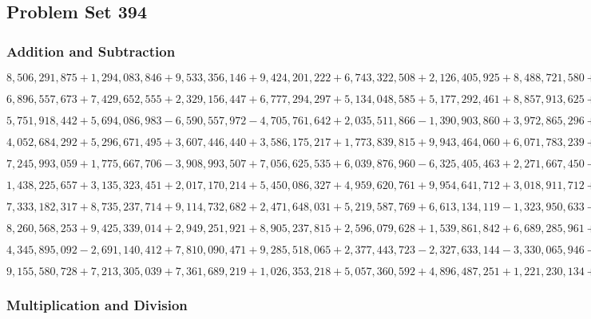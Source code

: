 \hypertarget{problem-set-394}{%
\subsection{Problem Set 394}\label{problem-set-394}}

\hypertarget{addition-and-subtraction}{%
\subsubsection{Addition and
Subtraction}\label{addition-and-subtraction}}

\(8,506,291,875+1,294,083,846+9,533,356,146+9,424,201,222+6,743,322,508+2,126,405,925+8,488,721,580+4,318,150,846+3,478,534,201+3,077,527,584\)

\(6,896,557,673+7,429,652,555+2,329,156,447+6,777,294,297+5,134,048,585+5,177,292,461+8,857,913,625+3,091,035,600+4,187,916,793+7,549,970,447\)

\(5,751,918,442+5,694,086,983-6,590,557,972-4,705,761,642+2,035,511,866-1,390,903,860+3,972,865,296+1,778,127,066-5,224,680,365+4,298,227,673\)

\(4,052,684,292+5,296,671,495+3,607,446,440+3,586,175,217+1,773,839,815+9,943,464,060+6,071,783,239+8,407,725,401+8,641,983,490+5,274,466,877\)

\(7,245,993,059+1,775,667,706-3,908,993,507+7,056,625,535+6,039,876,960-6,325,405,463+2,271,667,450-6,127,273,721-4,962,592,826+8,510,776,148\)

\(1,438,225,657+3,135,323,451+2,017,170,214+5,450,086,327+4,959,620,761+9,954,641,712+3,018,911,712+8,705,025,475+7,528,462,682+4,929,245,891\)

\(7,333,182,317+8,735,237,714+9,114,732,682+2,471,648,031+5,219,587,769+6,613,134,119-1,323,950,633-6,974,716,240-1,180,332,061-3,704,118,288\)

\(8,260,568,253+9,425,339,014+2,949,251,921+8,905,237,815+2,596,079,628+1,539,861,842+6,689,285,961+4,491,597,791+8,141,144,829+1,454,313,017\)

\(4,345,895,092-2,691,140,412+7,810,090,471+9,285,518,065+2,377,443,723-2,327,633,144-3,330,065,946-2,969,283,944+9,268,566,173+8,963,483,630\)

\(9,155,580,728+7,213,305,039+7,361,689,219+1,026,353,218+5,057,360,592+4,896,487,251+1,221,230,134+1,116,951,296+6,559,459,986+6,997,792,394\)

\hypertarget{multiplication-and-division}{%
\subsubsection{Multiplication and
Division}\label{multiplication-and-division}}

